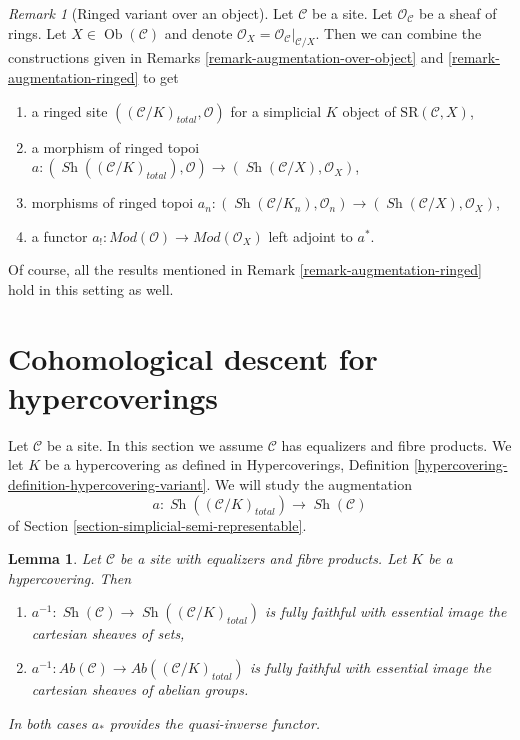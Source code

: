 \documentclass{stacks-project}
\theoremstyle{plain}
\newtheorem{lemma}[subsection]{Lemma}
\theoremstyle{definition}
\theoremstyle{remark}
\newtheorem{remark}[subsection]{Remark}
\numberwithin{equation}{subsection}
\def\Ob{\mathop{\mathrm{Ob}}\nolimits}
\def\Sh{\mathop{\mathit{Sh}}\nolimits}
\begin{document}
\begin{remark}[Ringed variant over an object]
\label{remark-augmentation-ringed-over-object}
Let $\mathcal{C}$ be a site. Let $\mathcal{O}_\mathcal{C}$ be a sheaf of rings.
Let $X \in \Ob(\mathcal{C})$ and denote
$\mathcal{O}_X = \mathcal{O}_\mathcal{C}|_{\mathcal{C}/X}$.
Then we can combine the constructions given in
Remarks \ref{remark-augmentation-over-object} and
\ref{remark-augmentation-ringed}
to get
\begin{enumerate}
\item a ringed site $((\mathcal{C}/K)_{total}, \mathcal{O})$
for a simplicial $K$ object of $\text{SR}(\mathcal{C}, X)$,
\item a morphism of ringed topoi
$a : (\Sh((\mathcal{C}/K)_{total}), \mathcal{O}) \to
(\Sh(\mathcal{C}/X), \mathcal{O}_X)$,
\item morphisms of ringed topoi
$a_n : (\Sh(\mathcal{C}/K_n), \mathcal{O}_n) \to
(\Sh(\mathcal{C}/X), \mathcal{O}_X)$,
\item a functor
$a_! : \textit{Mod}(\mathcal{O}) \to \textit{Mod}(\mathcal{O}_X)$
left adjoint to $a^*$.
\end{enumerate}
Of course, all the results mentioned in
Remark \ref{remark-augmentation-ringed}
hold in this setting as well.
\end{remark}






\section{Cohomological descent for hypercoverings}
\label{section-cohomological-descent-hypercoverings}

\noindent
Let $\mathcal{C}$ be a site. In this section we assume $\mathcal{C}$
has equalizers and fibre products. We let $K$ be a hypercovering
as defined in Hypercoverings, Definition
\ref{hypercovering-definition-hypercovering-variant}. We will study
the augmentation
$$
a : \Sh((\mathcal{C}/K)_{total}) \longrightarrow \Sh(\mathcal{C})
$$
of Section \ref{section-simplicial-semi-representable}.

\begin{lemma}
\label{lemma-hypercovering-descent-sheaves}
Let $\mathcal{C}$ be a site with equalizers and fibre products.
Let $K$ be a hypercovering. Then
\begin{enumerate}
\item $a^{-1} : \Sh(\mathcal{C}) \to \Sh((\mathcal{C}/K)_{total})$
is fully faithful with essential image the cartesian sheaves of sets,
\item $a^{-1} : \textit{Ab}(\mathcal{C}) \to
\textit{Ab}((\mathcal{C}/K)_{total})$
is fully faithful with essential image the cartesian sheaves
of abelian groups.
\end{enumerate}
In both cases $a_*$ provides the quasi-inverse functor.
\end{lemma}
\end{document}
